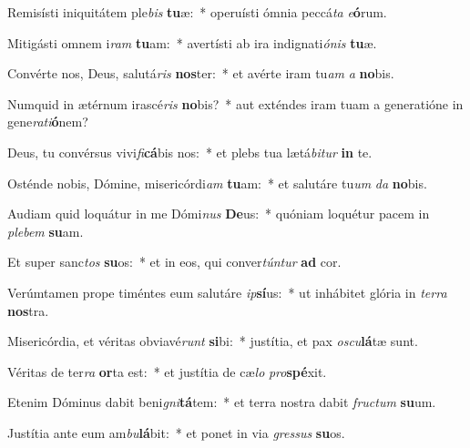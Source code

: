 \item Remisísti iniquitátem ple\textit{bis} \textbf{tu}æ:~* operuísti ómnia peccá\textit{ta} \textit{e}\textbf{ó}rum.
\item Mitigásti omnem i\textit{ram} \textbf{tu}am:~* avertísti ab ira indignati\textit{ó}\textit{nis} \textbf{tu}æ.
\item Convérte nos, Deus, salutá\textit{ris} \textbf{nos}ter:~* et avérte iram tu\textit{am} \textit{a} \textbf{no}bis.
\item Numquid in ætérnum irascé\textit{ris} \textbf{no}bis?~* aut exténdes iram tuam a generatióne in gene\textit{ra}\textit{ti}\textbf{ó}nem?
\item Deus, tu convérsus vivi\textit{fi}\textbf{cá}bis nos:~* et plebs tua lætá\textit{bi}\textit{tur} \textbf{in} te.
\item Osténde nobis, Dómine, misericórdi\textit{am} \textbf{tu}am:~* et salutáre tu\textit{um} \textit{da} \textbf{no}bis.
\item Audiam quid loquátur in me Dómi\textit{nus} \textbf{De}us:~* quóniam loquétur pacem in \textit{ple}\textit{bem} \textbf{su}am.
\item Et super sanc\textit{tos} \textbf{su}os:~* et in eos, qui conver\textit{tún}\textit{tur} \textbf{ad} cor.
\item Verúmtamen prope timéntes eum salutáre \textit{ip}\textbf{sí}us:~* ut inhábitet glória in \textit{ter}\textit{ra} \textbf{nos}tra.
\item Misericórdia, et véritas obviavé\textit{runt} \textbf{si}bi:~* justítia, et pax \textit{os}\textit{cu}\textbf{lá}tæ sunt.
\item Véritas de ter\textit{ra} \textbf{or}ta est:~* et justítia de cæ\textit{lo} \textit{pro}\textbf{spé}xit.
\item Etenim Dóminus dabit beni\textit{gni}\textbf{tá}tem:~* et terra nostra dabit \textit{fruc}\textit{tum} \textbf{su}um.
\item Justítia ante eum am\textit{bu}\textbf{lá}bit:~* et ponet in via \textit{gres}\textit{sus} \textbf{su}os.
